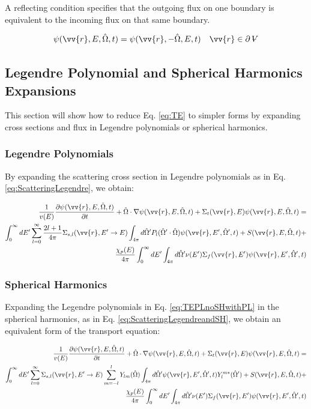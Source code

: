 \documentclass[10pt]{article}
\newcommand{\beq}{\begin{equation}}
\newcommand{\eeq}{\end{equation}}
\newcommand{\hO}{\hat{\Omega}}
\newcommand{\spa}{(\vv{r}, E, \hO, t)}
\newcommand{\spap}{(\vv{r}, E', \hO',t)}
\newcounter{subsubsubsection}[subsubsection]
\newcommand{\volume}{\mathop{\ooalign{\hfil$V$\hfil\cr\kern0.08em--\hfil\cr}}\nolimits}
\begin{document}
\begin{flushleft}
A reflecting condition specifies that the outgoing flux on one boundary is equivalent to the incoming flux on that same boundary.

\beq
\psi\spa =\psi(\vv{r},-\hO  ,E,t)\quad\vv{r}\in\partial \volume
\eeq

\subsection{Legendre Polynomial and Spherical Harmonics Expansions}
This section will show how to reduce Eq. \eqref{eq:TE} to simpler forms by expanding cross sections and flux in Legendre polynomials or spherical harmonics.

\subsubsection{Legendre Polynomials}

By expanding the scattering cross section in Legendre polynomials as in Eq. \ref{eq:ScatteringLegendre}, we obtain:

\begin{equation}
\label{eq:TEPLnoSHwithPL}
\begin{aligned}
\frac{1}{v(E)} \frac{\partial\psi\spa }{\partial t} +
 \hO  \cdot\nabla\psi\spa  + 
 \Sigma_t(\vv{r},E)\psi\spa  = \\
 \int_{0}^{\infty}dE' \sum_{l=0}^{\infty} \frac{2l+1}{4\pi}\Sigma_{s,l}(\vv{r}, E'\rightarrow E) \int_{4\pi}^{} d\hO  'P_l(\hO  '\cdot\hO  )\psi(\vv{r}, E', \hO  ', t) + S\spa +\\
  \frac{\chi_p(E)}{4\pi} \int_{0}^{\infty} dE'\int_{4\pi}^{} d\hO  '\nu(E')\Sigma_f(\vv{r}, E')\psi\spap\\
\end{aligned}
\end{equation}

\subsubsection{Spherical Harmonics}

Expanding the Legendre polynomials in Eq. \eqref{eq:TEPLnoSHwithPL} in the spherical harmonics, as in Eq. \ref{eq:ScatteringLegendreandSH}, we obtain an equivalent form of the transport equation:

\begin{equation}
\label{eq:TEPLnomoments}
\begin{aligned}
\frac{1}{v(E)} \frac{\partial\psi\spa }{\partial t} +
 \hO  \cdot\nabla\psi\spa  + 
 \Sigma_t(\vv{r},E)\psi\spa  = \\
 \int_{0}^{\infty}dE' \sum_{l=0}^{\infty} \Sigma_{s,l}(\vv{r}, E'\rightarrow E) \sum_{m=-l}^{l} Y_{lm}(\hO  )\int_{4\pi}^{} d\hO  '\psi(\vv{r}, E', \hO  ', t)Y_l^{m*}(\hO  ') + S\spa +\\
 \frac{\chi_p(E)}{4\pi} \int_{0}^{\infty} dE'\int_{4\pi}^{} d\hO  '\nu(E')\Sigma_f(\vv{r}, E')\psi\spap\\
\end{aligned}
\end{equation}


\end{flushleft}
\end{document}
